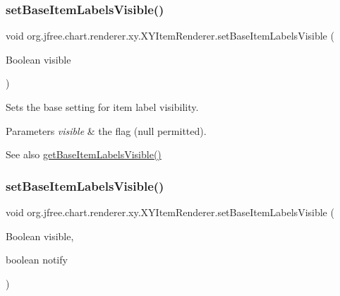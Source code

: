 \subsubsection{\texorpdfstring{set\+Base\+Item\+Labels\+Visible()}{setBaseItemLabelsVisible()}\hspace{0.1cm}{\footnotesize\ttfamily [2/3]}}
{\footnotesize\ttfamily void org.\+jfree.\+chart.\+renderer.\+xy.\+X\+Y\+Item\+Renderer.\+set\+Base\+Item\+Labels\+Visible (\begin{DoxyParamCaption}\item[{Boolean}]{visible }\end{DoxyParamCaption})}

Sets the base setting for item label visibility.


\begin{DoxyParams}{Parameters}
{\em visible} & the flag ({\ttfamily null} permitted).\\
\hline
\end{DoxyParams}
\begin{DoxySeeAlso}{See also}
\mbox{\hyperlink{interfaceorg_1_1jfree_1_1chart_1_1renderer_1_1xy_1_1_x_y_item_renderer_ae4e0917061a6ac9dc7d4aecae71890c5}{get\+Base\+Item\+Labels\+Visible()}} 
\end{DoxySeeAlso}
\mbox{\label{interfaceorg_1_1jfree_1_1chart_1_1renderer_1_1xy_1_1_x_y_item_renderer_af9b47701f840b27512709b5dc55532aa}} 
\subsubsection{\texorpdfstring{set\+Base\+Item\+Labels\+Visible()}{setBaseItemLabelsVisible()}\hspace{0.1cm}{\footnotesize\ttfamily [3/3]}}
{\footnotesize\ttfamily void org.\+jfree.\+chart.\+renderer.\+xy.\+X\+Y\+Item\+Renderer.\+set\+Base\+Item\+Labels\+Visible (\begin{DoxyParamCaption}\item[{Boolean}]{visible,  }\item[{boolean}]{notify }\end{DoxyParamCaption})}

